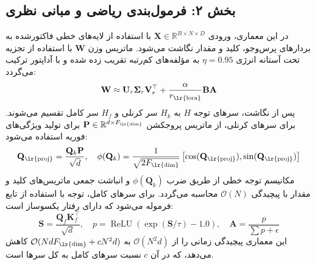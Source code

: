 \subsection*{بخش ۲: فرمول‌بندی ریاضی و مبانی نظری }
در این معماری، ورودی $\mathbf{X} \in \mathbb{R}^{B \times N \times D}$ با استفاده از لایه‌های خطی فاکتورشده  به بردارهای پرس‌وجو، کلید و مقدار نگاشت می‌شود. ماتریس وزن $\mathbf{W}$ با استفاده از تجزیه  تحت آستانه انرژی $\eta = 0.95$ به مؤلفه‌های کم‌رتبه تقریب زده شده و با آداپتور  ترکیب می‌گردد:
\begin{equation}
\mathbf{W} \approx \mathbf{U}_r \mathbf{\Sigma}_r \mathbf{V}_r^\top + \frac{\alpha}{r_{\text{\lr{lora}}}} \mathbf{B} \mathbf{A}
\end{equation}
پس از نگاشت، سرهای توجه $H$ به $H_k$ سر کرنلی و $H_f$ سر کامل تقسیم می‌شوند.
برای سرهای کرنلی، از ماتریس پروجکشن $\mathbf{P} \in \mathbb{R}^{d \times F_{\text{\lr{dim}}}}$ برای تولید ویژگی‌های فوریه استفاده می‌شود:
\begin{equation}
\mathbf{Q}_{\text{\lr{proj}}} = \frac{\mathbf{Q}_k \mathbf{P}}{\sqrt{d}}, \quad \phi(\mathbf{Q}_k) = \frac{1}{\sqrt{2 F_{\text{\lr{dim}}}}} \left[ \cos(\mathbf{Q}_{\text{\lr{proj}}}), \sin(\mathbf{Q}_{\text{\lr{proj}}}) \right]
\end{equation}
مکانیسم توجه خطی از طریق ضرب $\phi(\mathbf{Q}_k)$ و انباشت جمعی ماتریس‌های کلید و مقدار  با پیچیدگی $\mathcal{O}(N)$ محاسبه می‌گردد.
برای سرهای کامل، توجه با استفاده از تابع  فرموله می‌شود که دارای رفتار یکسوساز  است:
\begin{equation}
\mathbf{S} = \frac{\mathbf{Q}_f \mathbf{K}_f^\top}{\sqrt{d}}, \quad p = \operatorname{ReLU}\left( \exp(\mathbf{S} / \tau) - 1.0 \right), \quad \mathbf{A} = \frac{p}{\sum p + \epsilon}
\end{equation}
این معماری پیچیدگی زمانی را از $\mathcal{O}(N^2 d)$ به $\mathcal{O}(N d F_{\text{\lr{dim}}} + c N^2 d)$ کاهش می‌دهد، که در آن $c$ نسبت سرهای کامل به کل سرها است.

